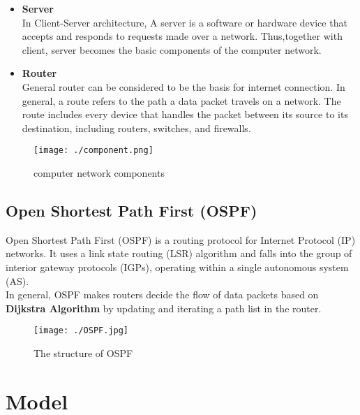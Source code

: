 \documentclass{elegantpaper}
\begin{document}
 \begin{itemize}[noitemsep]\item\textbf{Server}\\
 In Client-Server architecture, A server is a software or hardware device that accepts and responds to requests made over a network. Thus,together with client, server becomes the basic components of the computer network.
 \end{itemize}

 \begin{itemize}[noitemsep]\item\textbf{Router}\\
 General router can be considered to be the basis for internet connection.
In general, a route refers to the path a data packet travels on a network. The route includes every device that handles the packet between its source to its destination, including routers, switches, and firewalls.
 \end{itemize}
 \begin{figure}[htbp]
	
	\centering
	
	\texttt{[image: ./component.png]}
	
	\caption{computer network components}
	
\end{figure}

\subsection{Open Shortest Path First (OSPF)}
Open Shortest Path First (OSPF) is a routing protocol for Internet Protocol (IP) networks. It uses a link state routing (LSR) algorithm and falls into the group of interior gateway protocols (IGPs), operating within a single autonomous system (AS).\\
In general, OSPF makes routers decide the flow of data packets based on \textbf{Dijkstra Algorithm} by updating and iterating a path list in the router.
\begin{figure}[htbp]
	
	\centering
	
	\texttt{[image: ./OSPF.jpg]}
	
	\caption{The structure of OSPF}
	
\end{figure}

\section{Model} 
\end{document}
